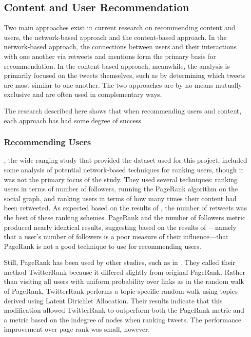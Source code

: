 \subsection{Content and User Recommendation}
\label{sec:ContentRecommendationResearch}

Two main approaches exist in current research on recommending content and users, the network-based approach and the content-based approach. In the network-based approach, the connections between users and their interactions with one another via retweets and mentions form the primary basis for recommendation. In the content-based approach, meanwhile, the analysis is primarily focused on the tweets themselves, such as by determining which tweets are most similar to one another. The two approaches are by no means mutually exclusive and are often used in complementary ways.

The research described here shows that when recommending users and content, each approach has had some degree of success.

\subsubsection{Recommending Users}

\cite{Kwak2010}, the wide-ranging study that provided the dataset used for this project, included some analysis of potential network-based techniques for ranking users, though it was not the primary focus of the study. They used several techniques: ranking users in terms of number of followers, running the PageRank algorithm on the social graph, and ranking users in terms of how many times their content had been retweeted. As expected based on the results of \cite{Welch2011}, the number of retweets was the best of these ranking schemes. PageRank and the number of followers metric produced nearly identical results, suggesting based on the results of \cite{Cha2010}---namely that a user's number of followers is a poor measure of their influence---that PageRank is not a good technique to use for recommending users.

Still, PageRank has been used by other studies, such as in \cite{Weng2010}. They called their method TwitterRank because it differed slightly from original PageRank. Rather than visiting all users with uniform probability over links as in the random walk of PageRank, TwitterRank performs a topic-specific random walk using topics derived using Latent Dirichlet Allocation. Their results indicate that this modification allowed TwitterRank to outperform both the PageRank metric and a metric based on the indegree of nodes when ranking tweets. The performance improvement over page rank was small, however.

